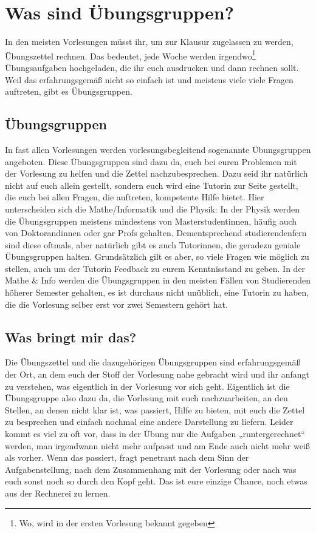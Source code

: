 \vfill
\eject

\section{Was sind Übungsgruppen?}

\noindent In den meisten Vorlesungen müsst ihr, um zur Klausur zugelassen zu werden, Übungszettel rechnen. Das bedeutet, jede Woche werden irgendwo\footnote{Wo, wird in der ersten Vorlesung bekannt gegeben} Übungsaufgaben hochgeladen, die ihr euch ausdrucken und dann rechnen sollt. Weil das erfahrungsgemäß nicht so einfach ist und meistens viele viele Fragen auftreten, gibt es Übungsgruppen.

\subsection{Übungsgruppen}
In fast allen Vorlesungen werden vorlesungsbegleitend sogenannte Übungsgruppen angeboten. Diese Übungsgruppen sind dazu da, euch bei euren Problemen mit der Vorlesung zu helfen und die Zettel nachzubesprechen. Dazu seid ihr natürlich nicht auf euch allein gestellt, sondern euch wird eine Tutorin zur Seite gestellt, die euch bei allen Fragen, die auftreten, kompetente Hilfe bietet. Hier unterscheiden sich die Mathe/Informatik und die Physik: In der Physik werden die Übungsgruppen meistens mindestens von Masterstudentinnen, häufig auch von Doktorandinnen oder gar Profs gehalten. Dementsprechend studierendenfern sind diese oftmals, aber natürlich gibt es auch Tutorinnen, die geradezu geniale Übungsgruppen halten. Grundsätzlich gilt es aber, so viele Fragen wie möglich zu stellen, auch um der Tutorin Feedback zu eurem Kenntnisstand zu geben. In der Mathe \& Info werden die Übungsgruppen in den meisten Fällen von Studierenden höherer Semester gehalten, es ist durchaus nicht unüblich, eine Tutorin zu haben, die die Vorlesung selber erst vor zwei Semestern gehört hat.

\subsection{Was bringt mir das?}
Die Übungszettel und die dazugehörigen Übungsgruppen sind erfahrungsgemäß der Ort, an dem euch der Stoff der Vorlesung nahe gebracht wird und ihr anfangt zu verstehen, was eigentlich in der Vorlesung vor sich geht. Eigentlich ist die Übungsgruppe also dazu da, die Vorlesung mit euch nachzuarbeiten, an den Stellen, an denen nicht klar ist, was passiert, Hilfe zu bieten, mit euch die Zettel zu besprechen und einfach nochmal eine andere Darstellung zu liefern. Leider kommt es viel zu oft vor, dass in der Übung nur die Aufgaben „runtergerechnet“ werden, man irgendwann nicht mehr aufpasst und am Ende auch nicht mehr weiß als vorher. Wenn das passiert, fragt penetrant nach dem Sinn der Aufgabenstellung, nach dem Zusammenhang mit der Vorlesung oder nach was euch sonst noch so durch den Kopf geht. Das ist eure einzige Chance, noch etwas aus der Rechnerei zu lernen.

